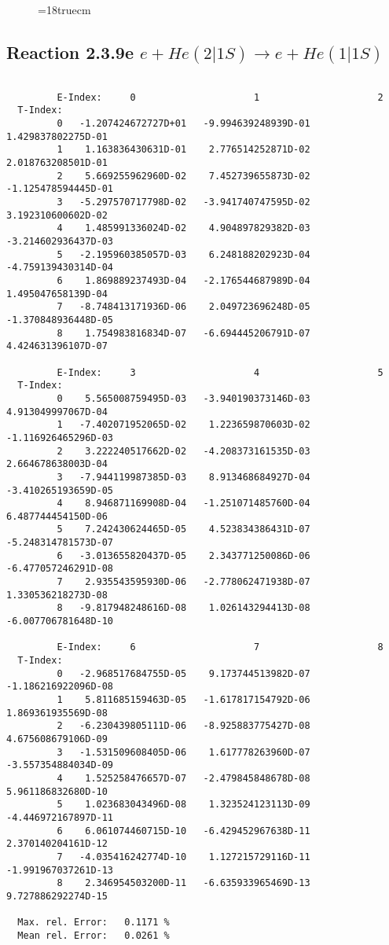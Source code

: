 \begin{figure} \label{2.3.9d}
\epsfxsize=18truecm
\end{figure}
\newpage
\subsection{
Reaction 2.3.9e  $e + He(2|1S) \rightarrow e + He(1|1S) $
}


\begin{verbatim}

         E-Index:     0                     1                     2
  T-Index:
         0   -1.207424672727D+01   -9.994639248939D-01    1.429837802275D-01
         1    1.163836430631D-01    2.776514252871D-02    2.018763208501D-01
         2    5.669255962960D-02    7.452739655873D-02   -1.125478594445D-01
         3   -5.297570717798D-02   -3.941740747595D-02    3.192310600602D-02
         4    1.485991336024D-02    4.904897829382D-03   -3.214602936437D-03
         5   -2.195960385057D-03    6.248188202923D-04   -4.759139430314D-04
         6    1.869889237493D-04   -2.176544687989D-04    1.495047658139D-04
         7   -8.748413171936D-06    2.049723696248D-05   -1.370848936448D-05
         8    1.754983816834D-07   -6.694445206791D-07    4.424631396107D-07

         E-Index:     3                     4                     5
  T-Index:
         0    5.565008759495D-03   -3.940190373146D-03    4.913049997067D-04
         1   -7.402071952065D-02    1.223659870603D-02   -1.116926465296D-03
         2    3.222240517662D-02   -4.208373161535D-03    2.664678638003D-04
         3   -7.944119987385D-03    8.913468684927D-04   -3.410265193659D-05
         4    8.946871169908D-04   -1.251071485760D-04    6.487744454150D-06
         5    7.242430624465D-05    4.523834386431D-07   -5.248314781573D-07
         6   -3.013655820437D-05    2.343771250086D-06   -6.477057246291D-08
         7    2.935543595930D-06   -2.778062471938D-07    1.330536218273D-08
         8   -9.817948248616D-08    1.026143294413D-08   -6.007706781648D-10

         E-Index:     6                     7                     8
  T-Index:
         0   -2.968517684755D-05    9.173744513982D-07   -1.186216922096D-08
         1    5.811685159463D-05   -1.617817154792D-06    1.869361935569D-08
         2   -6.230439805111D-06   -8.925883775427D-08    4.675608679106D-09
         3   -1.531509608405D-06    1.617778263960D-07   -3.557354884034D-09
         4    1.525258476657D-07   -2.479845848678D-08    5.961186832680D-10
         5    1.023683043496D-08    1.323524123113D-09   -4.446972167897D-11
         6    6.061074460715D-10   -6.429452967638D-11    2.370140204161D-12
         7   -4.035416242774D-10    1.127215729116D-11   -1.991967037261D-13
         8    2.346954503200D-11   -6.635933965469D-13    9.727886292274D-15

  Max. rel. Error:   0.1171 %
  Mean rel. Error:   0.0261 %


\end{verbatim}

